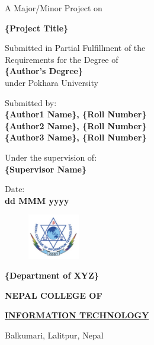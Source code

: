 \documentclass[12pt, a4paper]{report}
\begin{document}
\begin{titlepage}
	\begin{center}
	
	\large%
	A Major/Minor Project on
	
	\huge %
	\textbf {\{Project Title\}}

	\vfill
	
	\large %
	Submitted in Partial Fulfillment of the \\ 
	Requirements for the Degree of \\ 
	\textbf {\{Author's Degree\}} \\
	under Pokhara University
	
	\vfill
	
	Submitted by: \\ 
	\textbf {\{Author1 Name\}, \{Roll Number\}} \\
	\textbf {\{Author2 Name\}, \{Roll Number\}} \\
	\textbf {\{Author3 Name\}, \{Roll Number\}} \\
	
	\vfill
	
	Under the supervision of: \\
	\textbf {\{Supervisor Name\}}
	
	\vfill
	
	Date: \\
	\textbf {dd MMM yyyy}
	
	\vfill
	
	\end{center}
	
	\begin{figure}
	\centering
	\includegraphics[width=0.2\textwidth]{college-logo}
	\end{figure}
	
	\selectfont
	
	\textbf {\{Department of XYZ\}}  
	
	\Large %
	\textbf {NEPAL COLLEGE OF} 
	
	\LARGE %
	\textbf {\underline {INFORMATION TECHNOLOGY} }
	
	\small %
	Balkumari, Lalitpur, Nepal
	
	
\end{titlepage}
\end{document}
